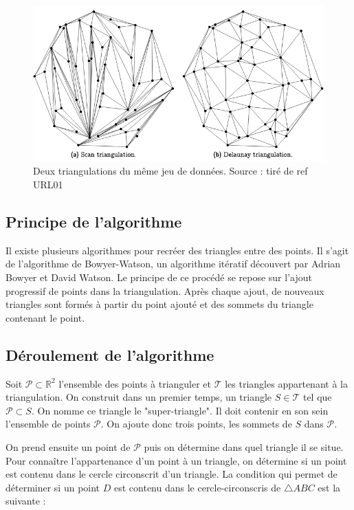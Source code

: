\begin{figure}[htb!]
    \centering
    \includegraphics[width=0.8\linewidth]{figures/triangulation-example.png}
    \caption{Deux triangulations du même jeu de données. Source : tiré de ref URL01}
    \label{fig:triangulation_example}
\end{figure}

\subsection{Principe de l'algorithme}
Il existe plusieurs algorithmes pour recréer des triangles entre des points.
Il s’agit de l’algorithme de Bowyer-Watson, un algorithme itératif découvert par Adrian Bowyer et David Watson.
Le principe de ce procédé se repose sur l’ajout progressif de points dans la triangulation.
Après chaque ajout, de nouveaux triangles sont formés à partir du point ajouté et des sommets du triangle contenant le point.

\subsection{Déroulement de l'algorithme}
Soit $\mathcal{P} \subset \mathbb{R}^2$ l'ensemble des points à trianguler et $\mathcal{T}$ les triangles appartenant à la triangulation. On construit dans un premier temps, un triangle $S \in \mathcal{T}$ tel que $\mathcal{P} \subset S$. On nomme ce triangle le "super-triangle". Il doit contenir en son sein l'ensemble de points $\mathcal{P}$. On ajoute donc trois points, les sommets de $S$ dans $\mathcal{P}$.

On prend ensuite un point de $\mathcal{P}$ puis on détermine dans quel triangle il se situe.
Pour connaître l'appartenance d'un point à un triangle, on détermine si un point est contenu dans le cercle circonscrit d'un triangle.
La condition qui permet de déterminer si un point $D$ est contenu dans le cercle-circonscris de $\triangle ABC$ est la suivante :

